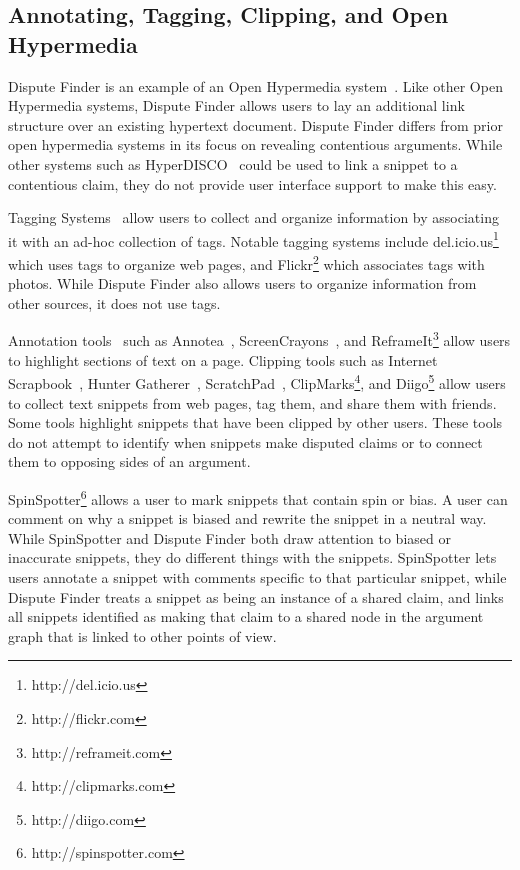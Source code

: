 \documentclass{www2010-submission}
\newcommand{\todo}[1]{}
\begin{document}
\subsection{Annotating, Tagging, Clipping, and Open Hypermedia}

Dispute Finder is an example of an Open Hypermedia system~\cite{Bouvin2000}. Like other Open Hypermedia systems, Dispute Finder allows users to lay an additional link structure over an existing hypertext document. Dispute Finder differs from prior open hypermedia systems in its focus on revealing contentious arguments. While other systems such as HyperDISCO~\cite{Wiil1996} could be used to link a snippet to a contentious claim, they do not provide user interface support to make this easy.

\todo{Say how different from other Open Hypermedia link annotation systems}

Tagging Systems~\cite{Marlow2006,Golder2006} allow users to collect and organize information by associating it with an ad-hoc collection of tags. Notable tagging systems include del.icio.us\footnote{http://del.icio.us} which uses tags to organize web pages, and Flickr\footnote{http://flickr.com} which associates tags with photos. While Dispute Finder also allows users to organize information from other sources, it does not use tags.

Annotation tools~\cite{Marshall1998} such as Annotea~\cite{Koivunen2001}, ScreenCrayons~\cite{Olsen2004}, and ReframeIt\footnote{http://reframeit.com} allow users to highlight sections of text on a page. Clipping tools such as Internet Scrapbook~\cite{Sugiura1998}, Hunter Gatherer~\cite{Schraefel2002}, ScratchPad~\cite{Gotz2007}, ClipMarks\footnote{http://clipmarks.com}, and Diigo\footnote{http://diigo.com} allow users to collect text snippets from web pages, tag them, and share them with friends. Some tools highlight snippets that have been clipped by other users. These tools do not attempt to identify when snippets make disputed claims or to connect them to opposing sides of an argument.

SpinSpotter\footnote{http://spinspotter.com} allows a user to mark snippets that contain spin or bias. A user can comment on why a snippet is biased and rewrite the snippet in a neutral way. While SpinSpotter and Dispute Finder both draw attention to biased or inaccurate snippets, they do different things with the snippets. SpinSpotter lets users annotate a snippet with comments specific to that particular snippet, while Dispute Finder treats a snippet as being an instance of a shared claim, and links all snippets identified as making that claim to a shared node in the argument graph that is linked to other points of view.
\end{document}
